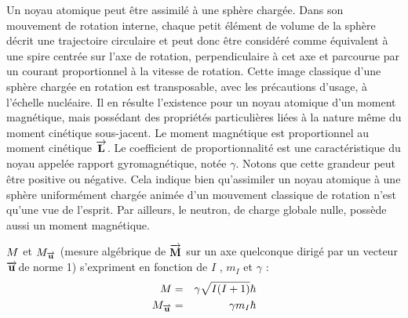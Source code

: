 Un noyau atomique peut être assimilé à une sphère chargée.
Dans son mouvement de rotation interne,
chaque petit élément de volume de la sphère décrit une
trajectoire circulaire et peut donc être considéré comme équivalent
à une spire centrée sur l'axe de rotation,
perpendiculaire à cet axe et parcourue par un courant proportionnel
à la vitesse de rotation.
Cette image classique d'une sphère chargée en rotation est transposable,
avec les précautions d'usage, à l'échelle nucléaire.
Il en résulte l'existence pour un noyau atomique d'un moment magnétique,
mais possédant des propriétés particulières liées à la nature
même du moment cinétique sous-jacent.
Le moment magnétique est proportionnel au moment cinétique $\overrightarrow{\mathbf{L}}$.
Le coefficient de proportionnalité est une
caractéristique du noyau appelée rapport gyromagnétique, notée $\gamma$.
Notons que cette grandeur peut être positive ou négative.
Cela indique bien qu'assimiler un noyau atomique à une sphère uniformément
chargée animée d'un mouvement classique de rotation n'est qu'une vue de l'esprit.
Par ailleurs, le neutron, de charge globale nulle, possède aussi un moment
magnétique.

$M$ et $M_{\overrightarrow{\mathbf{u}}}$ (mesure algébrique de $\overrightarrow{\mathbf{M}}$
sur un axe quelconque dirigé par un vecteur $\overrightarrow{\mathbf{u}}$de norme 1)
s'expriment en fonction de $I$ , $m_I$ et $\gamma$ :
\begin{eqnarray}
M & = & \gamma \sqrt{I(I+1)}\hbar \\
M_{\overrightarrow{\mathbf{u}}} & = & \gamma m_I \hbar
\end{eqnarray}

